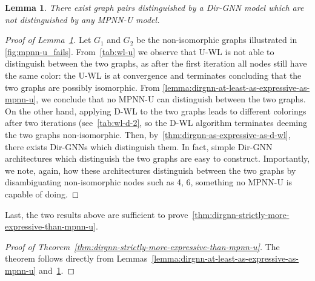 \documentclass{article}
\newcommand\oursacro{Dir-GNN}
\theoremstyle{plain}
\newtheorem{lemma}[theorem]{Lemma}
\theoremstyle{definition}
\theoremstyle{remark}
\begin{document}
\begin{lemma}\label{lemma:exists-graphs-distinguished-by-dirgnn-but-not-by-mpnn-u}
    There exist graph pairs distinguished by a \oursacro{} model which are not distinguished by any MPNN-U model.
\end{lemma}
\begin{proof}[Proof of Lemma~\ref{lemma:exists-graphs-distinguished-by-dirgnn-but-not-by-mpnn-u}]
    Let $G_1$ and $G_2$ be the non-isomorphic graphs illustrated in \cref{fig:mpnn-u_fails}. From~\cref{tab:wl-u} we observe that U-WL is not able to distinguish between the two graphs, as after the first iteration all nodes still have the same color: the U-WL is at convergence and terminates concluding that the two graphs are possibly isomorphic. From \cref{lemma:dirgnn-at-least-as-expressive-as-mpnn-u}, we conclude that no MPNN-U can distinguish between the two graphs. On the other hand, applying D-WL to the two graphs leads to different colorings after two iterations (see~\cref{tab:wl-d-2}, so the D-WL algorithm terminates deeming the two graphs non-isomorphic. Then, by~\cref{thm:dirgnn-as-expressive-as-d-wl}, there exists \oursacro{}s which distinguish them. In fact, simple \oursacro{} architectures which distinguish the two graphs are easy to construct. Importantly, we note, again, how these architectures distinguish between the two graphs by disambiguating non-isomorphic nodes such as 4, 6, something no MPNN-U is capable of doing.
\end{proof}

Last, the two results above are sufficient to prove~\cref{thm:dirgnn-strictly-more-expressive-than-mpnn-u}.

\begin{proof}[Proof of Theorem~\ref{thm:dirgnn-strictly-more-expressive-than-mpnn-u}]
    The theorem follows directly from Lemmas~\ref{lemma:dirgnn-at-least-as-expressive-as-mpnn-u} and~\ref{lemma:exists-graphs-distinguished-by-dirgnn-but-not-by-mpnn-u}.
\end{proof}
\end{document}
